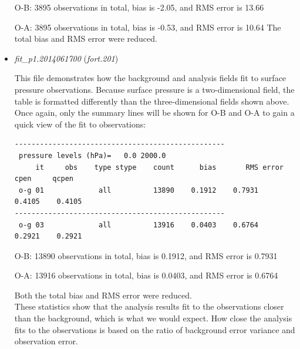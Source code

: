 \begin{itemize}[leftmargin=*]
\begin{tiny}
\begin{verbatim}
\end{verbatim}
\end{tiny}

\hspace{1cm} O-B: 3895 observations in total, bias is -2.05, and RMS error is 13.66

\hspace{1cm} O-A: 3895 observations in total, bias is -0.53, and RMS error is 10.64\newline
The total bias and RMS error were reduced. \\


\item \textit{fit\_p1.2014061700} (\textit{fort.201})

 This file demonstrates how the background and analysis fields fit to surface pressure observations.  Because surface pressure is a two-dimensional field, the table is formatted differently than the three-dimensional fields shown above.  Once again, only the summary lines will be shown for O-B and O-A to gain a quick view of the fit to observations:
 
 \begin{scriptsize}
 \begin{verbatim}
--------------------------------------------------
 pressure levels (hPa)=   0.0 2000.0
     it     obs    type stype    count      bias       RMS error      cpen     qcpen
 o-g 01             all          13890    0.1912    0.7931    0.4105    0.4105
--------------------------------------------------
 o-g 03             all          13916    0.0403    0.6764    0.2921    0.2921 
 \end{verbatim}
 \end{scriptsize}
 
\hspace{1cm} O-B: 13890 observations in total, bias is 0.1912, and RMS error is 0.7931

\hspace{1cm} O-A: 13916 observations in total, bias is 0.0403, and RMS error is 0.6764\newline

Both the total bias and RMS error were reduced. \\

These statistics show that the analysis results fit to the observations closer than the background, which is what we would expect.  How close the analysis fits to the observations is based on the ratio of background error variance and observation error. 

\end{itemize}

